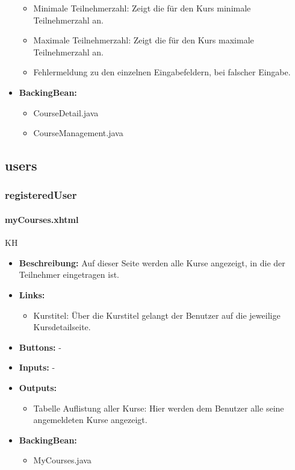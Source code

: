 \begin{itemize}
\begin{itemize}
								\item Minimale Teilnehmerzahl: Zeigt die für den Kurs minimale Teilnehmerzahl an.
								\item Maximale Teilnehmerzahl: Zeigt die für den Kurs maximale Teilnehmerzahl an.
								\item Fehlermeldung zu den einzelnen Eingabefeldern, bei falscher Eingabe.
							\end{itemize}
						\item \textbf{BackingBean:}
							\begin{itemize}
								\item CourseDetail.java
								\item CourseManagement.java
							\end{itemize}
					\end{itemize}
		
		\subsection{users}
		
			\subsubsection{registeredUser}
				
				\paragraph{myCourses.xhtml}
					KH\\
					\begin{itemize}
						\item \textbf{Beschreibung:} Auf dieser Seite werden alle Kurse angezeigt, in die der Teilnehmer eingetragen ist.
						\item \textbf{Links:}
							\begin{itemize}
								\item Kurstitel: Über die Kurstitel gelangt der Benutzer auf die jeweilige Kursdetailseite.
							\end{itemize}
						\item \textbf{Buttons:} -
						\item \textbf{Inputs:} -
						\item \textbf{Outputs:}
							\begin{itemize}
								\item Tabelle Auflistung aller Kurse: Hier werden dem Benutzer alle seine angemeldeten Kurse angezeigt.
							\end{itemize}
						\item \textbf{BackingBean:}
							\begin{itemize}
								\item MyCourses.java
							\end{itemize}
					\end{itemize}
				
